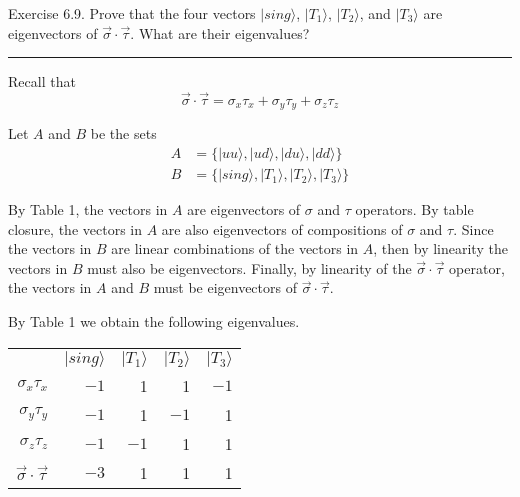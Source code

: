 \documentclass[12pt]{article}
\begin{document}
Exercise 6.9.
Prove that the four vectors $|sing\rangle$, $|T_1\rangle$,
$|T_2\rangle$, and $|T_3\rangle$ are eigenvectors of
$\vec\sigma\cdot\vec\tau$.
What are their eigenvalues?

\bigskip
\hrule

\bigskip
Recall that
\begin{equation*}
\vec\sigma\cdot\vec\tau=\sigma_x\tau_x+\sigma_y\tau_y+\sigma_z\tau_z
\end{equation*}

Let $A$ and $B$ be the sets
\begin{align*}
A&=\{|uu\rangle, |ud\rangle, |du\rangle, |dd\rangle\}
\\
B&=\{|sing\rangle, |T_1\rangle, |T_2\rangle, |T_3\rangle\}
\end{align*}

By Table 1, the vectors in $A$ are eigenvectors of $\sigma$ and $\tau$ operators.
By table closure, the vectors in $A$ are also eigenvectors of compositions of $\sigma$ and $\tau$.
Since the vectors in $B$ are linear combinations of the vectors in $A$,
then by linearity the vectors in $B$ must also be eigenvectors.
Finally, by linearity of the $\vec\sigma\cdot\vec\tau$ operator,
the vectors in $A$ and $B$ must
be eigenvectors of $\vec\sigma\cdot\vec\tau$.

\bigskip
By Table 1 we obtain the following eigenvalues.
\begin{center}
\begin{tabular}{rrrrr}
& $|sing\rangle$ & $|T_1\rangle$ & $|T_2\rangle$ & $|T_3\rangle$
\\[1ex]
$\sigma_x\tau_x$ & $-1$ & 1 & 1 & $-1$
\\
$\sigma_y\tau_y$ & $-1$ & 1 & $-1$ & 1
\\
$\sigma_z\tau_z$ & $-1$ & $-1$ & 1 & 1
\\[1ex]
$\vec\sigma\cdot\vec\tau$ & $-3$ & 1 & 1 & 1
\end{tabular}
\end{center}
\end{document}

